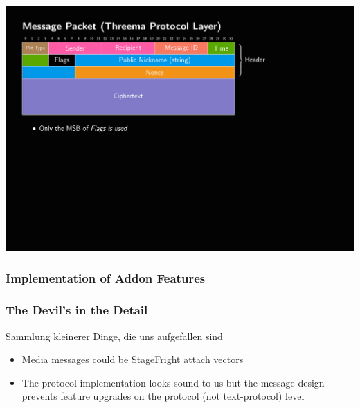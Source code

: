 \documentclass[
	aspectratio=169,
	xetex,
]{beamer}
\begin{document}
\begin{frame}
\begin{overlayarea}{\textwidth}{\textheight}
{			\includegraphics[page=15,clip,trim={.99cm 7.5cm 3.2cm 1.8cm},width=\textwidth]{out/messages.pdf}

		}
	\end{overlayarea}
\end{frame}


\begin{frame}
	\frametitle{Implementation of Addon Features}
		
\end{frame}



\begin{frame}
	\frametitle{The Devil's in the Detail}
	Sammlung kleinerer Dinge, die uns aufgefallen sind
	\begin{itemize}
		\item Media messages could be StageFright attach vectors
		\item The protocol implementation looks sound to us but the message design prevents feature upgrades on the protocol (not text-protocol) level

	\end{itemize}
\end{frame}


\end{document}
